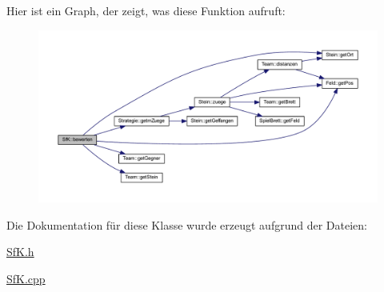 Hier ist ein Graph, der zeigt, was diese Funktion aufruft\+:\nopagebreak
\begin{figure}[H]
\begin{center}
\leavevmode
\includegraphics[width=350pt]{class_sf_k_a54410f0aa0c2f76704a0eb181a5737f0_cgraph}
\end{center}
\end{figure}




Die Dokumentation für diese Klasse wurde erzeugt aufgrund der Dateien\+:\begin{DoxyCompactItemize}
\item 
\hyperlink{_sf_k_8h}{Sf\+K.\+h}\item 
\hyperlink{_sf_k_8cpp}{Sf\+K.\+cpp}\end{DoxyCompactItemize}
